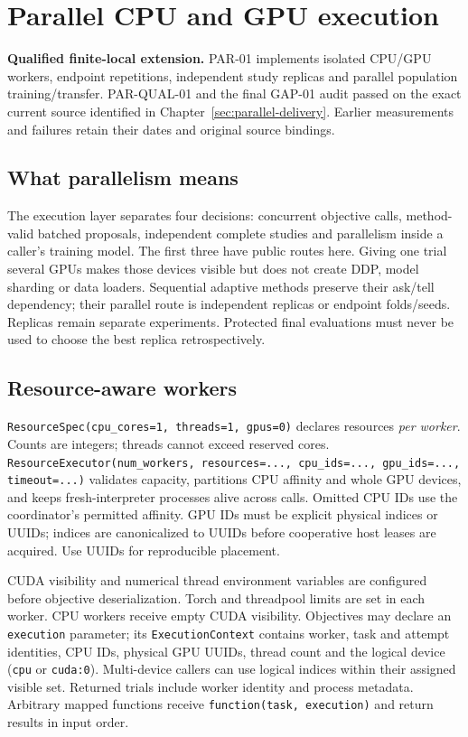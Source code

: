 \chapter{Parallel CPU and GPU execution}
\label{sec:parallel-extension}

\begin{decisions}
\textbf{Qualified finite-local extension.} PAR-01 implements isolated CPU/GPU
workers, endpoint repetitions, independent study replicas and parallel population
training/transfer. PAR-QUAL-01 and the final GAP-01 audit passed on the exact
current source identified in Chapter~\ref{sec:parallel-delivery}. Earlier
measurements and failures retain their dates and original source bindings.
\end{decisions}

\section{What parallelism means}
The execution layer separates four decisions: concurrent objective calls,
method-valid batched proposals, independent complete studies and parallelism
inside a caller's training model. The first three have public routes here.
Giving one trial several GPUs makes those devices visible but does not create
DDP, model sharding or data loaders. Sequential adaptive methods preserve their
ask/tell dependency; their parallel route is independent replicas or endpoint
folds/seeds. Replicas remain separate experiments. Protected final evaluations
must never be used to choose the best replica retrospectively.

\section{Resource-aware workers}
\texttt{ResourceSpec(cpu\_cores=1, threads=1, gpus=0)} declares resources
\emph{per worker}. Counts are integers; threads cannot exceed reserved cores.
\texttt{ResourceExecutor(num\_workers, resources=..., cpu\_ids=...,
gpu\_ids=..., timeout=...)} validates capacity, partitions CPU affinity and
whole GPU devices, and keeps fresh-interpreter processes alive across calls.
Omitted CPU IDs use the coordinator's permitted affinity. GPU IDs must be
explicit physical indices or UUIDs; indices are canonicalized to UUIDs before
cooperative host leases are acquired. Use UUIDs for reproducible placement.

CUDA visibility and numerical thread environment variables are configured
before objective deserialization. Torch and threadpool limits are set in each
worker. CPU workers receive empty CUDA visibility. Objectives may declare an
\texttt{execution} parameter; its \texttt{ExecutionContext} contains worker,
task and attempt identities, CPU IDs, physical GPU UUIDs, thread count and the
logical device (\texttt{cpu} or \texttt{cuda:0}). Multi-device callers can use
logical indices within their assigned visible set. Returned trials include
worker identity and process metadata. Arbitrary mapped functions receive
\texttt{function(task, execution)} and return results in input order.

